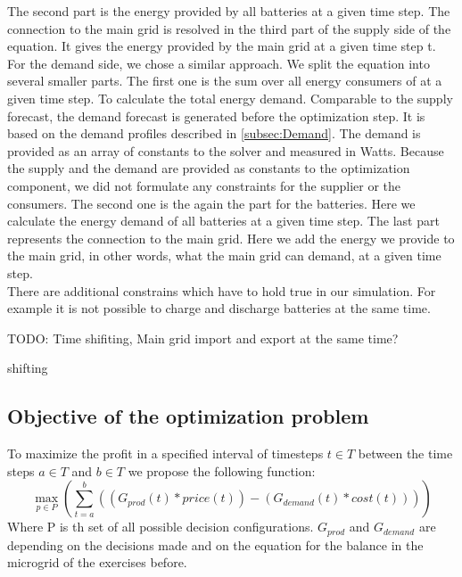 The second part is the energy provided by all batteries at a given time step.
The connection to the main grid is resolved in the third part of the supply side of the equation.
It gives the energy provided by the main grid at a given time step t.\\
For the demand side, we chose a similar approach.
We split the equation into several smaller parts.
The first one is the sum over all energy consumers of at a given time step. To calculate the total energy demand. Comparable to the supply forecast, the demand forecast is generated before the optimization step. It is based on the demand profiles described in \cref{subsec:Demand}. The demand is provided as an array of constants to the solver and measured in Watts. Because the supply and the demand are provided as constants to the optimization component, we did not formulate any constraints for the supplier or the consumers.
The second one is the again the part for the batteries.
Here we calculate the energy demand of all batteries at a given time step.
The last part represents the connection to the main grid.
Here we add the energy we provide to the main grid, in other words, what the main grid can demand, at a given time step.\\

There are additional constrains which have to hold true in our simulation. 
For example it is not possible to charge and discharge batteries at the same time.

TODO: Time shifiting, Main grid import and export at the same time? 

shifting
\subsection{Objective of the optimization problem}
To maximize the profit in a specified interval of timesteps $t \in T$ between the time steps $a \in T$ and $b \in T$ we propose the following function:\\
\begin{equation} \label{eq:opt}
\max_{p \in P}{(\sum_{t=a}^{b}{((G_{prod}(t)*price(t))-(G_{demand}(t)*cost(t)))})}
\end{equation}
Where P is th set of all possible decision configurations. $G_{prod}$ and $G_{demand}$ are depending on the decisions made and on the equation for the balance in the microgrid of the exercises before.
